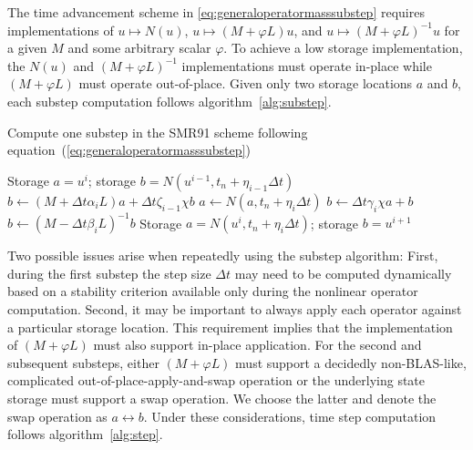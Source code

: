 \documentclass[letterpaper,11pt,nointlimits,reqno,draft]{amsart}
\begin{document}
The time advancement scheme in \eqref{eq:generaloperatormasssubstep} requires
implementations of $u\mapsto{}{N}\left(u\right)$,
$u\mapsto{}\left(M+\varphi{}L\right)u$, and
$u\mapsto{}\left(M+\varphi{}L\right)^{-1}u$ for a given $M$ and some arbitrary
scalar $\varphi$.  To achieve a low storage implementation, the
$N\left(u\right)$ and $\left(M+\varphi{}L\right)^{-1}$ implementations must
operate in-place while $\left(M+\varphi{}L\right)$ must operate out-of-place.
Given only two storage locations $a$ and $b$, each substep computation follows
algorithm~\vref{alg:substep}.

\begin{algorithm}
\label{alg:substep}
\caption{Compute one substep in the SMR91 scheme following
         equation~(\ref{eq:generaloperatormasssubstep})
         }
\begin{algorithmic}
  \REQUIRE Storage $a = u^i$;
           storage $b = N\left(u^{i-1},t_{n}+\eta_{i-1}\Delta{}t\right)$
  \STATE $b\leftarrow{}   \left(M+\Delta{}t\alpha_{i}L\right)a
                        + \Delta{}t\zeta_{i-1}\chi{}b$
  \STATE $a\leftarrow{}N\left(a,t_{n}+\eta_{i}\Delta{}t\right)$
  \STATE $b\leftarrow{}\Delta{}t\gamma_{i}\chi{}a + b$
  \STATE $b\leftarrow{}\left(M-\Delta{}t\beta_{i}L\right)^{-1}b$
  \ENSURE Storage $a = N\left(u^{i},t_{n}+\eta_{i}\Delta{}t\right)$;
          storage $b = u^{i+1}$
\end{algorithmic}
\end{algorithm}

Two possible issues arise when repeatedly using the substep algorithm: First,
during the first substep the step size $\Delta{}t$ may need to be computed
dynamically based on a stability criterion available only during the nonlinear
operator computation.  Second, it may be important to always apply each
operator against a particular storage location.  This requirement implies that
the implementation of $\left(M+\varphi{}L\right)$ must also support in-place
application.  For the second and subsequent substeps, either
$\left(M+\varphi{}L\right)$ must support a decidedly non-BLAS-like, complicated
out-of-place-apply-and-swap operation or the underlying state storage must
support a swap operation.  We choose the latter and denote the swap operation
as $a\leftrightarrow{}b$.  Under these considerations, time step computation
follows algorithm~\vref{alg:step}.
\end{document}
